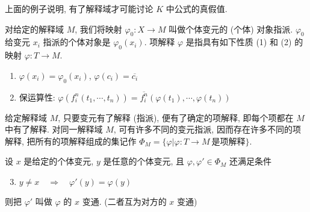 \documentclass[
    mode=hazy,
    color=blue,
    device=normal,
    lang=cn
]{elegantnote}
\begin{document}
上面的例子说明, 有了解释域才可能讨论 $K$ 中公式的真假值.
\begin{definition}[项解释]
    对给定的解释域 $M$, 我们将映射 $\varphi_0: X\to M$ 叫做个体变元的 (个体) 对象指派. $\varphi_0$ 给变元 $x_i$ 指派的个体对象是 $\varphi_0(x_i)$. 项解释 $\varphi$ 是指具有如下性质 (1) 和 (2) 的映射 $\varphi: T\to M$.
    \begin{enumerate}[(1)]
        \item $\varphi(x_i)=\varphi_0(x_i)$, $\varphi(c_i)=\overline{c_i}$
        \item 保运算性: $\varphi(f_i^n(t_1, \cdots, t_n))=\overline{f_i^n}(\varphi(t_1), \cdots, \varphi(t_n))$
    \end{enumerate}
\end{definition}
给定解释域 $M$, 只要变元有了解释 (指派), 便有了确定的项解释, 即每个项都在 $M$ 中有了解释. 对同一解释域 $M$, 可有许多不同的变元指派, 因而存在许多不同的项解释, 把所有的项解释组成的集记作 $\Phi_M = \{\varphi\vert\varphi:T\to M\ \text{是项解释}\}$.
\begin{definition}[项解释的变元变通]
    设 $x$ 是给定的个体变元, $y$ 是任意的个体变元, 且 $\varphi, \varphi'\in\Phi_M$ 还满足条件
    \begin{enumerate}[(1)]\setcounter{enumi}{2}
        \item $y\neq x\quad\Rightarrow\quad \varphi'(y)=\varphi(y)$
    \end{enumerate} 
    则把 $\varphi'$ 叫做 $\varphi$ 的 $x$ 变通. (二者互为对方的 $x$ 变通)
\end{definition}
\end{document}
